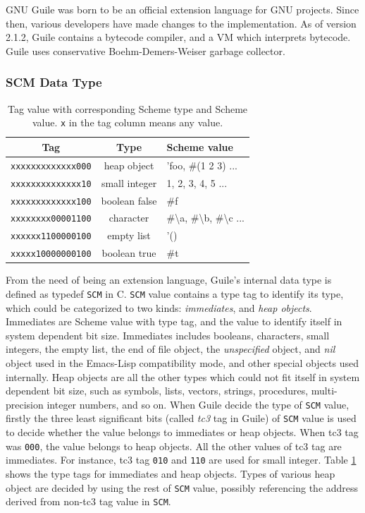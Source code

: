 \documentclass[preprint, numbers]{sigplanconf}
\begin{document}
GNU Guile was born to be an official extension language for GNU
projects\cite{guileref}. Since then, various developers have made changes to
the implementation. As of version 2.1.2, Guile contains a bytecode compiler,
and a VM which interprets bytecode. Guile uses conservative
Boehm-Demers-Weiser garbage collector\cite{boehm1988garbage}.


\subsubsection{SCM Data Type}
\begin{table}
  \centering
  \begin{tabular}{|c|c|l|} \hline
    Tag&Type&Scheme value\\ \hline
    \texttt{xxxxxxxxxxxxx000} & heap object & 'foo, \#(1 2 3) ... \\ %
    \texttt{xxxxxxxxxxxxxx10} & small integer & 1, 2, 3, 4, 5 ... \\ %
    \texttt{xxxxxxxxxxxxx100} & boolean false & \#f \\ %
    \texttt{xxxxxxxx00001100} & character & \#\textbackslash a, \#\textbackslash b,
    \#\textbackslash c ... \\ %
    \texttt{xxxxxx1100000100} & empty list & '() \\ %
    \texttt{xxxxx10000000100} & boolean true & \#t \\ \hline
  \end{tabular}
  \caption{Tag value with corresponding Scheme type and Scheme
    value. \texttt{x} in the tag column means any value.}
  \label{tab:tags}
\end{table}

From the need of being an extension language, Guile's internal data type is
defined as typedef \texttt{SCM} in C\cite{guileref}. \texttt{SCM} value
contains a type tag to identify its type, which could be categorized to two
kinds: \textit{immediates}, and \textit{heap objects}. Immediates are Scheme
value with type tag, and the value to identify itself in system dependent bit
size. Immediates includes booleans, characters, small integers, the empty
list, the end of file object, the \textit{unspecified} object, and
\textit{nil} object used in the Emacs-Lisp compatibility mode, and other
special objects used internally. Heap objects are all the other types which
could not fit itself in system dependent bit size, such as symbols, lists,
vectors, strings, procedures, multi-precision integer numbers, and so on.
When Guile decide the type of \texttt{SCM} value, firstly the three least
significant bits (called \textit{tc3} tag in Guile) of \texttt{SCM} value is
used to decide whether the value belongs to immediates or heap objects. When
tc3 tag was \texttt{000}, the value belongs to heap objects. All the other
values of tc3 tag are immediates. For instance, tc3 tag \texttt{010} and
\texttt{110} are used for small integer. Table
\hyperref[tab:tags]{\ref{tab:tags}} shows the type tags for immediates and
heap objects. Types of various heap object are decided by using the rest of
\texttt{SCM} value, possibly referencing the address derived from non-tc3
tag value in \texttt{SCM}.
\end{document}
